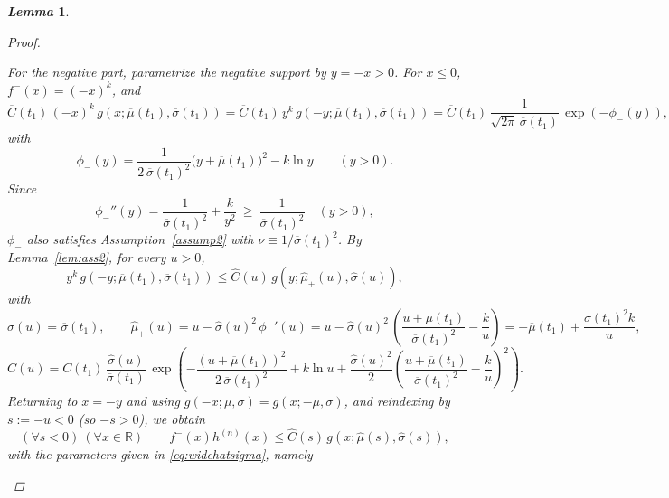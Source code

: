 \documentclass[review]{elsarticle}
\newtheorem{lemma}{\em Lemma}
\begin{document}
\begin{lemma}
\begin{proof}
\begin{enumerate}
For the negative part, parametrize the negative support by $y=-x>0$. For $x\le 0$, $f^-(x)=(-x)^k$, and
\begin{equation}
\overline{C}(t_1)\,(-x)^k\, g\!\left(x;\overline{\mu}(t_1),\overline{\sigma}(t_1)\right)
=\overline{C}(t_1)\,y^k\, g\!\left(-y;\overline{\mu}(t_1),\overline{\sigma}(t_1)\right)
=\overline{C}(t_1)\,\frac{1}{\sqrt{2\pi}\,\overline{\sigma}(t_1)}\,\exp\!\left(-\phi_-(y)\right),
\end{equation}
with
\begin{equation}
\phi_-(y)=\frac{1}{2\,\overline{\sigma}(t_1)^2}\big(y+\overline{\mu}(t_1)\big)^2 - k\ln y \qquad (y>0).
\end{equation}
Since
\begin{equation}
\phi_-''(y)=\frac{1}{\overline{\sigma}(t_1)^2}+\frac{k}{y^2}\ \ge\ \frac{1}{\overline{\sigma}(t_1)^2}\quad (y>0),
\end{equation}
$\phi_-$ also satisfies Assumption~\ref{assump2} with $\nu\equiv 1/\overline{\sigma}(t_1)^2$. By Lemma~\ref{lem:ass2}, for every $u>0$,
\begin{equation}
y^k\, g\!\left(-y;\overline{\mu}(t_1),\overline{\sigma}(t_1)\right)
\le \widehat{C}(u)\, g\!\left(y;\widehat{\mu}_+(u),\widehat{\sigma}(u)\right),
\end{equation}
with
\begin{equation}
\widehat{\sigma}(u)=\overline{\sigma}(t_1),\qquad
\widehat{\mu}_+(u)=u-\widehat{\sigma}(u)^2\,\phi_-'(u)
= u-\widehat{\sigma}(u)^2\,\!\left(\frac{u+\overline{\mu}(t_1)}{\overline{\sigma}(t_1)^2}-\frac{k}{u}\right)=-\overline{\mu}(t_1)+\frac{\overline{\sigma}(t_1)^2k}{u},
\end{equation}
\begin{equation}
\widehat{C}(u)=\overline{C}(t_1)\,\frac{\widehat{\sigma}(u)}{\overline{\sigma}(t_1)}\,
\exp\!\left(-\frac{(u+\overline{\mu}(t_1))^2}{2\,\overline{\sigma}(t_1)^2}
+ k\ln u
+ \frac{\widehat{\sigma}(u)^2}{2}\left(\frac{u+\overline{\mu}(t_1)}{\overline{\sigma}(t_1)^2}-\frac{k}{u}\right)^{\!2}\right).
\end{equation}
Returning to $x=-y$ and using $g(-x;\mu,\sigma)=g(x;-\mu,\sigma)$, and reindexing by $s:=-u<0$ (so $-s>0$), we obtain
\begin{equation}
(\forall s<0)\ (\forall x\in\mathbb{R})\qquad
f^-(x) h^{(n)}(x) \le \widehat{C}(s)\, g\!\left(x;\widehat{\mu}(s),\widehat{\sigma}(s)\right),
\end{equation}
with the parameters given in \eqref{eq:widehatsigma}, namely
\begin{equation}

\end{equation}
\end{enumerate}
\end{proof}
\end{lemma}
\end{document}
